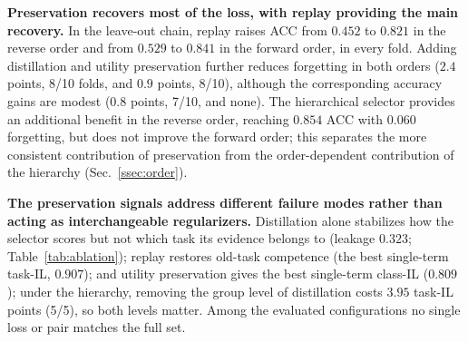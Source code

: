 \documentclass{article}
\begin{document}
\textbf{Preservation recovers most of the loss, with replay providing the main recovery.} In the leave-out chain, replay raises ACC from $0.452$ to $0.821$ in the reverse order and from $0.529$ to $0.841$ in the forward order, in every fold. Adding distillation and utility preservation further reduces forgetting in both orders ($2.4$ points, 8/10 folds, and $0.9$ points, 8/10), although the corresponding accuracy gains are modest ($0.8$ points, 7/10, and none). The hierarchical selector provides an additional benefit in the reverse order, reaching $0.854$ ACC with $0.060$ forgetting, but does not improve the forward order; this separates the more consistent contribution of preservation from the order-dependent contribution of the hierarchy (Sec.~\ref{ssec:order}).

\begin{table}[!htb]
\centering\footnotesize\renewcommand{\arraystretch}{0.92}
\setlength{\tabcolsep}{3.5pt}
\caption{\textbf{Preservation-component ablation with selection-level metrics} (flat, fold 1, 5-seed means). Jaccard and $\Delta U$ are reported for the sequential arms; $\Delta U$ is the per-slide mean change of $U=\log C-\mathrm{CE}$ (logit scale 56.3) on old-task test slides, averaged over old tasks.}
\label{tab:ablation}
\end{table}

\textbf{The preservation signals address different failure modes rather than acting as interchangeable regularizers.} Distillation alone stabilizes how the selector scores but not which task its evidence belongs to (leakage $0.323$; Table~\ref{tab:ablation}); replay restores old-task competence (the best single-term task-IL, $0.907$); and utility preservation gives the best single-term class-IL ($0.809$); under the hierarchy, removing the group level of distillation costs $3.95$ task-IL points (5/5), so both levels matter. Among the evaluated configurations no single loss or pair matches the full set.
\end{document}
